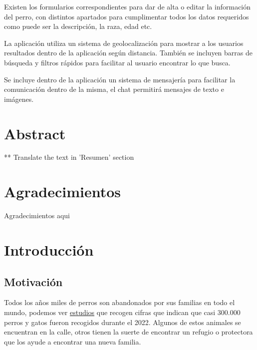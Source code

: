 \documentclass[a4paper, 12pt]{article}
\begin{document}
Existen los formularios correspondientes para dar de alta o editar la información del perro, con distintos apartados para cumplimentar todos los datos requeridos como puede ser la descripción, la raza, edad etc. 

La aplicación utiliza un sistema de geolocalización para mostrar a los usuarios resultados dentro de la aplicación según distancia. También se incluyen barras de búsqueda y filtros rápidos para facilitar al usuario encontrar lo que busca.

Se incluye dentro de la aplicación un sistema de mensajería para facilitar la comunicación dentro de la misma, el chat permitirá mensajes de texto e imágenes. 


\newpage
\pagestyle{plain}
\thispagestyle{empty}
\mbox{}

\newpage
\section*{Abstract}
** Translate the text in 'Resumen' section

\newpage
\thispagestyle{empty}
\mbox{}

\newpage
\section*{Agradecimientos}
\begin{center} 
\vspace*{\fill}
Agradecimientos aqui
\vspace*{\fill}
\end{center} 

\newpage
\thispagestyle{empty}
\mbox{}
\newpage
\thispagestyle{empty}
\mbox{}

\tableofcontents

\newpage
\thispagestyle{empty}
\mbox{}

\newpage
\section{Introducción}
\subsection{Motivación}
Todos los años miles de perros son abandonados por sus familias en todo el mundo, podemos ver \href{https://www.fundacion-affinity.org/perros-gatos-y-personas/busco-un-animal-de-compania/las-cifras-del-abandono-de-perros-y-gatos-aun}{estudios} que recogen cifras que indican que casi 300.000 perros y gatos fueron recogidos durante el 2022. Algunos de estos animales se encuentran en la calle, otros tienen la suerte de encontrar un refugio o protectora que los ayude a encontrar una nueva familia. 
\end{document}
